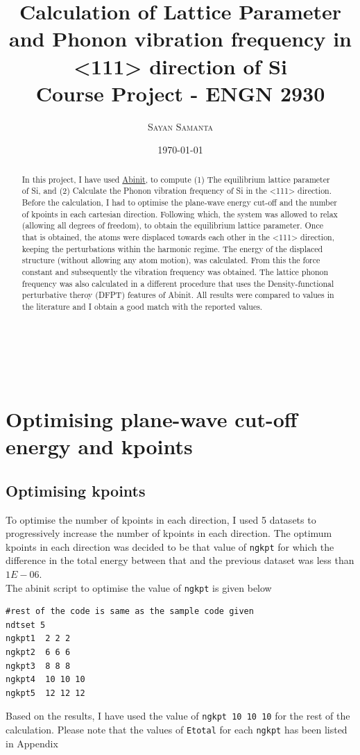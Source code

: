 \documentclass[12pt]{article} %
\title{\textbf{Calculation of Lattice Parameter and Phonon vibration frequency in <111> direction of Si}\\[0.5cm] %
Course Project - ENGN 2930} %
\author{\textsc{Sayan Samanta} %
}%
\date{\today} %
\makeatletter
\renewcommand{\maketitle}{ %
\begin{center} %
{\Large\@title} %

\vspace{20pt} %

{\large\@author} %
\\\@date \\ %

\vspace{20pt} %
\end{center}
}
\makeatother
\begin{document}
\maketitle %
\tableofcontents


\begin{abstract}
In this project, I have used \href{https://github.com/reach2sayan/ENGN\_2930.git}{Abinit}, to compute (1) The equilibrium lattice parameter of Si, and (2) Calculate the Phonon vibration frequency of Si in the <111> direction. Before the calculation, I had to optimise the plane-wave energy cut-off and the number of kpoints in each cartesian direction. Following which, the system was allowed to relax (allowing all degrees of freedom), to obtain the equilibrium lattice parameter. Once that is obtained, the atoms were displaced towards each other in the <111> direction, keeping the perturbations within the harmonic regime. The energy of the displaced structure (without allowing any atom motion), was calculated. From this the force constant and subsequently the vibration frequency was obtained. The lattice phonon frequency was also calculated in a different procedure that uses the Density-functional perturbative theroy (DFPT) features of Abinit. All results were compared to values in the literature and I obtain a good match with the reported values.
\end{abstract}

\section{Optimising plane-wave cut-off energy and kpoints}

\subsection{Optimising kpoints}

To optimise the number of kpoints in each direction, I used 5 datasets to progressively increase the number of kpoints in each direction. The optimum kpoints in each direction was decided to be that value of \verb|ngkpt| for which the difference in the total energy between that and the previous dataset was less than $1E-06$.\\
The abinit script to optimise the value of \verb|ngkpt| is given below
\begin{verbatim}
#rest of the code is same as the sample code given
ndtset 5
ngkpt1  2 2 2 
ngkpt2  6 6 6  
ngkpt3  8 8 8  
ngkpt4  10 10 10  
ngkpt5  12 12 12
\end{verbatim}
Based on the results, I have used the value of \verb|ngkpt 10 10 10| for the rest of the calculation.
Please note that the values of \verb|Etotal| for each \verb|ngkpt| has been listed in Appendix
\end{document}
